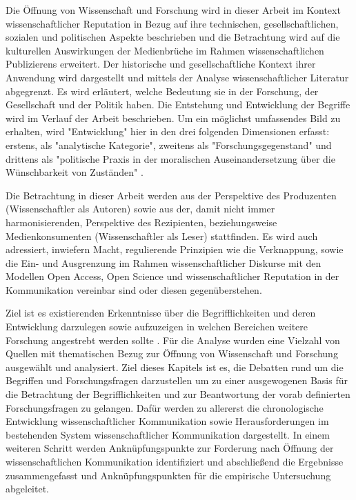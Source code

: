 Die Öffnung von Wissenschaft und Forschung wird in dieser Arbeit im Kontext wissenschaftlicher Reputation in Bezug auf ihre technischen, gesellschaftlichen, sozialen und politischen Aspekte beschrieben und die Betrachtung wird auf die kulturellen Auswirkungen der Medienbrüche im Rahmen wissenschaftlichen Publizierens erweitert. Der historische und gesellschaftliche Kontext ihrer Anwendung wird dargestellt und mittels der Analyse wissenschaftlicher Literatur abgegrenzt. Es wird erläutert, welche Bedeutung sie in der Forschung, der Gesellschaft und der Politik haben. Die Entstehung und Entwicklung der Begriffe wird im Verlauf der Arbeit beschrieben. Um ein möglichst umfassendes Bild zu erhalten, wird "Entwicklung" hier in den drei folgenden Dimensionen erfasst: erstens, als "analytische Kategorie", zweitens als "Forschungsgegenstand" und drittens als "politische Praxis in der moralischen Auseinandersetzung über die Wünschbarkeit von Zuständen" \cite{cite:10}.

Die Betrachtung in dieser Arbeit werden aus der Perspektive des Produzenten (Wissenschaftler als Autoren) sowie aus der, damit nicht immer harmonisierenden, Perspektive des Rezipienten, beziehungsweise Medienkonsumenten (Wissenschaftler als Leser) stattfinden. Es wird auch adressiert, inwiefern Macht, regulierende Prinzipien wie die Verknappung, sowie die Ein- und Ausgrenzung im Rahmen wissenschaftlicher Diskurse mit den Modellen Open Access, Open Science und wissenschaftlicher Reputation in der Kommunikation vereinbar sind oder diesen gegenüberstehen.

Ziel ist es existierenden Erkenntnisse über die Begrifflichkeiten und deren Entwicklung darzulegen sowie aufzuzeigen in welchen Bereichen weitere Forschung angestrebt werden sollte \cite{webster2002analyzing}. Für die Analyse wurden eine Vielzahl von Quellen mit thematischen Bezug zur Öffnung von Wissenschaft und Forschung ausgewählt und analysiert. Ziel dieses Kapitels ist es, die Debatten rund um die Begriffen und Forschungsfragen darzustellen um zu einer ausgewogenen Basis für die Betrachtung der Begrifflichkeiten und zur Beantwortung der vorab definierten Forschungsfragen zu gelangen. Dafür werden zu allererst die chronologische Entwicklung wissenschaftlicher Kommunikation sowie Herausforderungen im bestehenden System wissenschaftlicher Kommunikation dargestellt. In einem weiteren Schritt werden Anknüpfungspunkte zur Forderung nach Öffnung der wissenschaftlichen Kommunikation identifiziert und abschließend die Ergebnisse zusammengefasst und Anknüpfungspunkten für die empirische Untersuchung abgeleitet.

